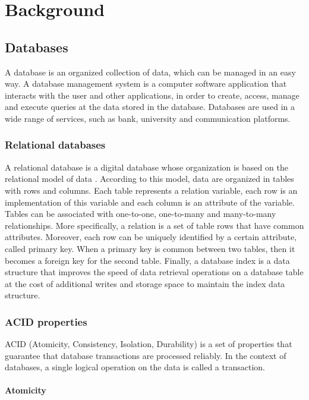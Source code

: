 \chapter{Background}

\section{Databases}

A database \cite{8} is an organized collection of data, which can be managed in an easy way. A database management system is a computer software application 
that interacts with the user and other applications, in order to create, access, manage and execute queries at the data stored in the database. 
Databases are used in a wide range of services, such as bank, university and communication platforms. 

\subsection{Relational databases}

A relational database is a digital database whose organization is based on the relational model of data \cite{9}. According to this model, data are organized in tables 
with rows and columns. Each table represents a relation variable, each row is an implementation of this variable and each column is an attribute of the variable. 
Tables can be associated with one-to-one, one-to-many and many-to-many relationships. More specifically, a relation is a set of table rows that have common attributes. 
Moreover, each row can be uniquely identified by a certain attribute, called primary key. When a primary key is common between two tables, then it becomes 
a foreign key for the second table. Finally, a database index is a data structure that improves the speed of data retrieval operations on a database table 
at the cost of additional writes and storage space to maintain the index data structure.

\subsection{ACID properties}

ACID (Atomicity, Consistency, Isolation, Durability) \cite{10} is a set of properties that guarantee that database transactions are processed reliably. 
In the context of databases, a single logical operation on the data is called a transaction. 

\subsubsection{Atomicity}

